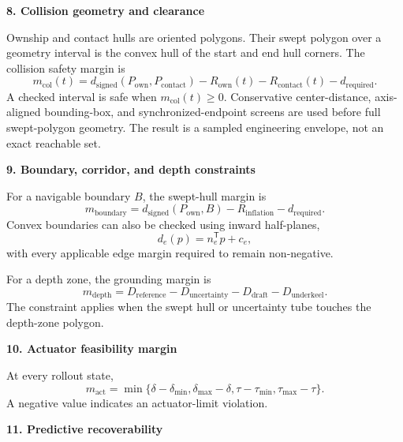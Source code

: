 \documentclass[10pt,a4paper]{article}
\newcommand{\sectionbar}[1]{%
  \vspace{4pt}%
  {\large\bfseries\color{hnavy}#1}\par
  \vspace{-2pt}{\color{hblue}\rule{\textwidth}{0.7pt}}\vspace{2pt}%
}
\begin{document}
\sectionbar{8. Collision geometry and clearance}

Ownship and contact hulls are oriented polygons. Their swept polygon over a geometry interval is the convex hull of the start and end hull corners. The collision safety margin is
\begin{equation}
  m_{\mathrm{col}}(t)=d_{\mathrm{signed}}
  (P_{\mathrm{own}},P_{\mathrm{contact}})
  -R_{\mathrm{own}}(t)-R_{\mathrm{contact}}(t)-d_{\mathrm{required}}.
\end{equation}
A checked interval is safe when $m_{\mathrm{col}}(t)\geq0$. Conservative center-distance, axis-aligned bounding-box, and synchronized-endpoint screens are used before full swept-polygon geometry. The result is a sampled engineering envelope, not an exact reachable set.

\sectionbar{9. Boundary, corridor, and depth constraints}

For a navigable boundary $B$, the swept-hull margin is
\begin{equation}
  m_{\mathrm{boundary}}=
  d_{\mathrm{signed}}(P_{\mathrm{own}},B)
  -R_{\mathrm{inflation}}-d_{\mathrm{required}}.
\end{equation}
Convex boundaries can also be checked using inward half-planes,
\begin{equation}
  d_e(p)=n_e^{\mathsf T}p+c_e,
\end{equation}
with every applicable edge margin required to remain non-negative.

For a depth zone, the grounding margin is
\begin{equation}
  m_{\mathrm{depth}}=D_{\mathrm{reference}}-D_{\mathrm{uncertainty}}
  -D_{\mathrm{draft}}-D_{\mathrm{underkeel}}.
\end{equation}
The constraint applies when the swept hull or uncertainty tube touches the depth-zone polygon.

\sectionbar{10. Actuator feasibility margin}

At every rollout state,
\begin{equation}
  m_{\mathrm{act}}=\min\{\delta-\delta_{\min},\delta_{\max}-\delta,
  \tau-\tau_{\min},\tau_{\max}-\tau\}.
\end{equation}
A negative value indicates an actuator-limit violation.

\sectionbar{11. Predictive recoverability}
\end{document}
